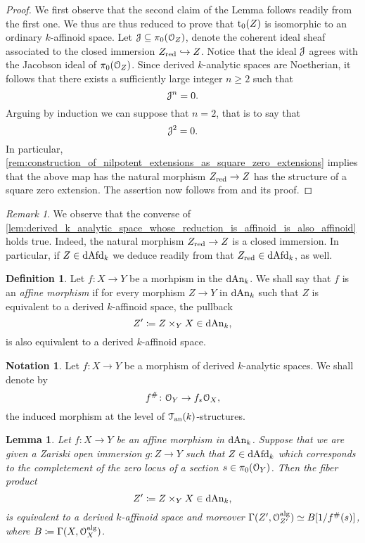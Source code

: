 \documentclass[10pt,a4paper,reqno]{amsart} %
\theoremstyle{plain}
\newtheorem{lem}[thm]{Lemma}
\theoremstyle{definition}
\newtheorem{defin}[thm]{Definition}
\newtheorem{notation}[thm]{Notation}
\theoremstyle{remark}
\newtheorem{rem}[thm]{Remark}
\numberwithin{equation}{section}
\begin{document}
\begin{proof} We first observe that the second claim of the Lemma follows readily from the first one. We thus are thus reduced to prove that $\mathrm{t}_0(Z)$ is isomorphic to an ordinary $k$-affinoid space.
    Let $\mathcal J \subseteq \pi_0(\mathcal O_Z)$, denote the coherent ideal sheaf associated to the closed immersion $Z_{\mathrm{red}} \hookrightarrow Z$. Notice that the ideal $\mathcal J$
    agrees with the Jacobson ideal of $\pi_0(\mathcal O_Z)$. Since derived $k$-analytic spaces are Noetherian, it follows that there exists
    a sufficiently large integer $n \ge 2$ such that
        \[
            \mathcal J^n = 0.  
        \]
    Arguing by induction we can suppose that $n = 2$, that is to say that
        \[\mathcal J^2 = 0.\]
    In particular, \cref{rem:construction_of_nilpotent_extensions_as_square_zero_extensions} implies that the above map has
    the natural morphism $Z_{\mathrm{red}} \to Z$ has the structure of a square zero extension.
    The assertion now follows from \cite[Proposition 6.1]{Porta_Yu_Representability}
    and its proof.
\end{proof}

\begin{rem}
    We observe that the converse of \cref{lem:derived_k_analytic_space_whose_reduction_is_affinoid_is_also_affinoid} holds true.
    Indeed, the natural morphism $Z_{\mathrm{red}} \to Z$ is a closed immersion. In particular, if $Z \in \mathrm{dAfd}_k$ we deduce readily from
    that $Z_{\mathrm{red}} \in \mathrm{dAfd}_k$, as well.
\end{rem}

\begin{defin}
    Let $f \colon X \to Y$ be a morhpism in the \infcat $\mathrm{dAn}_k$. We shall say that $f$ is an \emph{affine morphism} if
    for every morphism $Z \to Y$ in $\mathrm{dAn}_k$ such that $Z$ is equivalent to a derived $k$-affinoid space, the pullback
        \[
            Z' \coloneqq Z \times_Y X \in \mathrm{dAn}_k,  
        \]
    is also equivalent to a derived $k$-affinoid space.
\end{defin}

\begin{notation}
    Let $f \colon X \to Y$ be a morphism of derived $k$-analytic spaces. We shall denote by
        \[
            f^\# \colon \mathcal O_Y \to f_* \mathcal O_X,
        \]  
    the induced morphism at the level of $\mathcal T_{\mathrm{an}}(k)$-structures.
\end{notation}

\begin{lem} \label{lem:affine_morphisms_are_compatible_with_Zariski_localization_on_the_base}
    Let $f \colon X \to Y$ be an affine morphism in $\mathrm{dAn}_k$. Suppose that we are given a Zariski open immersion
    $g \colon Z \to Y$ such that $Z \in \mathrm{dAfd}_k$ which corresponds to the completement of the zero locus of a
    section $s \in \pi_0(\mathcal O_Y)$. Then the fiber product
        \[
            Z' \coloneqq Z \times_Y X \in \mathrm{dAn}_k,  
        \]
    is equivalent to a derived $k$-affinoid space and moreover $\Gamma(Z', \mathcal O_{Z'}^\mathrm{alg}) \simeq B[1/f^\#(s)]$, where
    $B \coloneqq \Gamma(X, \mathcal O_X^\mathrm{alg})$.
\end{lem}
\end{document}
